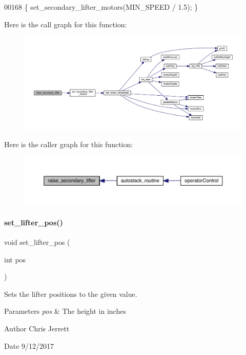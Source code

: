 \begin{DoxyCode}
00168 \{ set_secondary_lifter_motors(MIN\_SPEED / 1.5); \}
\end{DoxyCode}
Here is the call graph for this function\+:
\nopagebreak
\begin{figure}[H]
\begin{center}
\leavevmode
\includegraphics[width=350pt]{lifter_8h_a786f679ea48bb8c80e00fbac9a69911b_cgraph}
\end{center}
\end{figure}
Here is the caller graph for this function\+:
\nopagebreak
\begin{figure}[H]
\begin{center}
\leavevmode
\includegraphics[width=350pt]{lifter_8h_a786f679ea48bb8c80e00fbac9a69911b_icgraph}
\end{center}
\end{figure}
\mbox{\label{lifter_8h_abddc7cb502e12fa277b627c90a45efb1}} 
\paragraph{set\+\_\+lifter\+\_\+pos()}
{\footnotesize\ttfamily void set\+\_\+lifter\+\_\+pos (\begin{DoxyParamCaption}\item[{int}]{pos }\end{DoxyParamCaption})}



Sets the lifter positions to the given value. 


\begin{DoxyParams}{Parameters}
{\em pos} & The height in inches \\
\hline
\end{DoxyParams}
\begin{DoxyAuthor}{Author}
Chris Jerrett 
\end{DoxyAuthor}
\begin{DoxyDate}{Date}
9/12/2017 
\end{DoxyDate}



